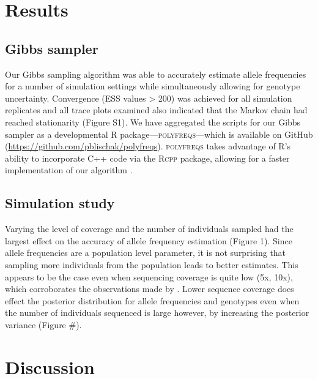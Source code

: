 \documentclass[11pt,english,letterpaper,oneside]{article}
\begin{document}
\section*{Results}         %

\subsection*{Gibbs sampler}
\medskip

Our Gibbs sampling algorithm was able to accurately estimate allele frequencies for a number of simulation settings while simultaneously allowing for genotype uncertainty. Convergence (ESS values > 200) was achieved for all simulation replicates and all trace plots examined also indicated that the Markov chain had reached stationarity (Figure S1). We have aggregated the scripts for our Gibbs sampler as a developmental R package---\textsc{polyfreqs}---which is available on GitHub (\url{https://github.com/pblischak/polyfreqs}). \textsc{polyfreqs} takes advantage of R's ability to incorporate C++ code via the \textsc{Rcpp} package, allowing for a faster implementation of our algorithm \citep{eddelbuettel2011rcpp,eddelbuettel2013rcppBook}.

\medskip
\subsection*{Simulation study}
\medskip

Varying the level of coverage and the number of individuals sampled had the largest effect on the accuracy of allele frequency estimation (Figure 1). Since allele frequencies are a population level parameter, it is not surprising that sampling more individuals from the population leads to better estimates. This appears to be the case even when sequencing coverage is quite low (5x, 10x), which corroborates the observations made by \cite{buerkle2013popModels}. Lower sequence coverage does effect the posterior distribution for allele frequencies and genotypes even when the number of individuals sequenced is large however, by increasing the posterior variance (Figure \#).
\medskip

\section*{Discussion}         %
\end{document}
